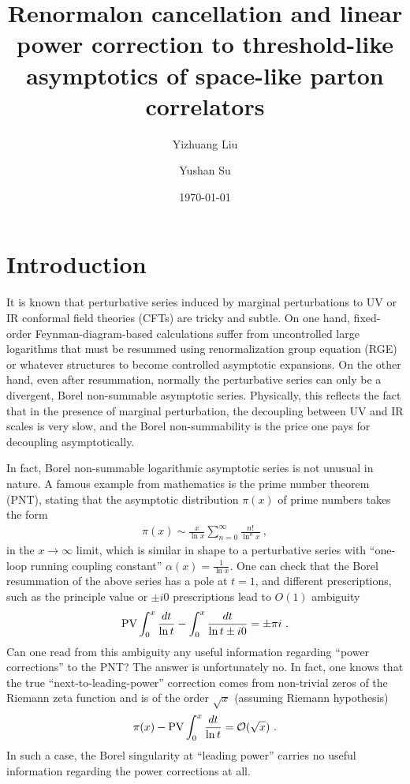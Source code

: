 \documentclass[a4paper,11pt]{article}
\title{Renormalon cancellation and linear power correction to threshold-like asymptotics of space-like parton correlators}
\author[a]{Yizhuang Liu}
\author[b]{Yushan Su}
\affiliation[a]{Institute of Theoretical Physics,
Jagiellonian University, 30-348 Kraków, Poland}
\affiliation[b ]{Department of Physics, University of Maryland, College Park, MD 20742}
\date{\today}
\begin{document}
\maketitle
\flushbottom



\section{Introduction}
It is known that perturbative series induced by marginal perturbations to UV or IR conformal field theories (CFTs) are tricky and subtle. On one hand, fixed-order Feynman-diagram-based calculations suffer from uncontrolled large logarithms that must be resummed using renormalization group equation (RGE) or whatever structures to become controlled asymptotic expansions. On the other hand, even after resummation, normally the perturbative series can only be a divergent, Borel non-summable asymptotic series. Physically, this reflects the fact that in the presence of marginal perturbation, the decoupling between UV and IR scales is very slow, and the Borel non-summability is the price one pays for decoupling asymptotically. 

In fact, Borel non-summable logarithmic asymptotic series is not unusual in nature. A famous example from mathematics is the prime number theorem (PNT), stating that the asymptotic distribution $\pi(x)$ of prime numbers takes the form 
\begin{align}\label{eq:PNT}
\pi (x)\sim \frac{x}{\ln x}\sum_{n=0}^{\infty} \frac{n!}{\ln^n x} \ ,
\end{align}
in the $x\rightarrow \infty$ limit, which is similar in shape to a perturbative series with ``one-loop running coupling constant'' $\alpha(x)=\frac{1}{\ln x}$. One can check that the Borel resummation of the above series has a pole at $t=1$, and different prescriptions, such as the principle value or $\pm i0$ prescriptions lead to $O(1)$ ambiguity
\begin{align}
{\rm PV}\int_{0}^{x}\frac{dt}{\ln t}-\int_{0}^{x} \frac{dt}{\ln t \pm i0}= \pm \pi i \ .
\end{align}
Can one read from this ambiguity any useful information regarding ``power corrections'' to the PNT? The answer is unfortunately no.  In fact, one knows that the true ``next-to-leading-power'' correction comes from non-trivial zeros of the Riemann zeta function and is of the order $\sqrt{x}$ (assuming Riemann hypothesis)
\begin{align}
\pi(x)-{\rm PV}\int_{0}^{x}\frac{dt}{\ln t}={\cal O}(\sqrt{x}) \ .
\end{align}
In such a case, the Borel singularity at ``leading power'' carries no useful information regarding the power corrections at all. 
\end{document}
